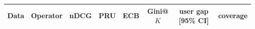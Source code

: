 \begin{tabular}{llcccccc}
\toprule
Data & Operator & nDCG & PRU & ECB & Gini@$K$ & user gap [95\% CI] & coverage\\
\bottomrule
\end{tabular}
